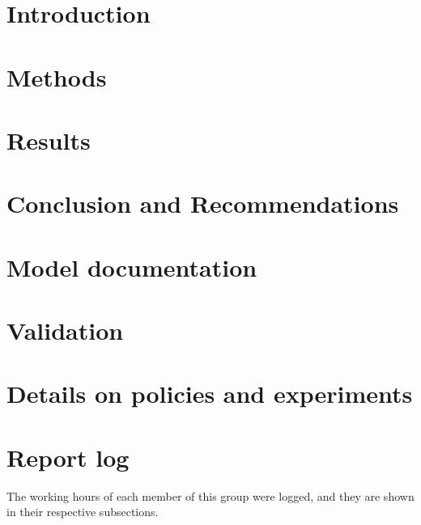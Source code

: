 \documentclass[a4paper,11, oneside]{article}
\begin{document}
\cleardoublepage{}

\section{Introduction}

\pagebreak

\section{Methods}
\label{ch:methods}

\pagebreak

\section{Results}
\label{ch:results}

\pagebreak

\section{Conclusion and Recommendations}
\label{ch:conclusion}

\pagebreak


\printbibliography


%
\pagebreak


\appendix
\section{Model documentation}
\label{ch:model_documentation}


%
\section{Validation}
\label{ch:validation} 

\clearpage
\section{Details on policies and experiments}
\label{ch:det_policies} 

\clearpage
\section{Report log}
\label{ch:report_log}
The working hours of each member of this group were logged, and they are shown in their respective subsections.





\end{document}
